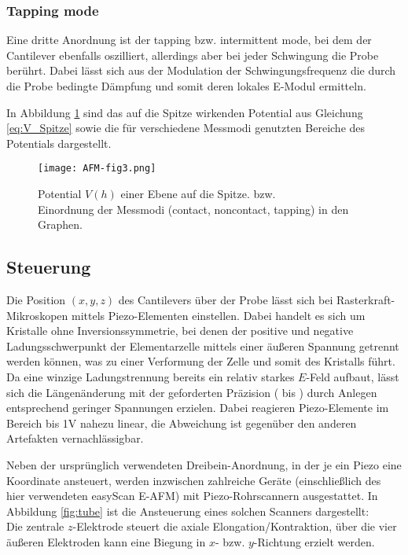 \subsubsection{Tapping mode}
 Eine dritte Anordnung ist der tapping bzw. intermittent mode, bei dem der Cantilever ebenfalls oszilliert, allerdings aber bei jeder Schwingung die Probe berührt. Dabei lässt sich aus der Modulation der Schwingungsfrequenz die durch die Probe bedingte Dämpfung und somit deren lokales E-Modul ermitteln.


In Abbildung \ref{fig:Potential} sind das auf die Spitze wirkenden Potential aus Gleichung \eqref{eq:V_Spitze} sowie die für verschiedene Messmodi genutzten Bereiche des Potentials dargestellt.


\begin{figure}[p]
	\centering
	\texttt{[image: AFM-fig3.png]}
	\caption[Potential $V(h)$ einer Ebene auf die Spitze]
		     {Potential $V(h)$ einer Ebene auf die Spitze. \cite{lit:grenoble} bzw. \cite{lit:jpk}\\
			Einordnung der Messmodi (contact, noncontact, tapping) in den Graphen.}
	\label{fig:Potential}
\end{figure}

\subsection{Steuerung}
Die Position $(x,y,z)$ des Cantilevers über der Probe lässt sich bei Rasterkraft-Mikroskopen mittels Piezo-Elementen einstellen. Dabei handelt es sich um Kristalle ohne Inversionssymmetrie, bei denen der positive und negative Ladungsschwerpunkt der Elementarzelle mittels einer äußeren Spannung getrennt werden können, was zu einer Verformung der Zelle und somit des Kristalls führt. Da eine winzige Ladungstrennung bereits ein relativ starkes $E$-Feld aufbaut, lässt sich die Längenänderung mit der geforderten Präzision (\pico\metre{} bis \micro\metre) durch Anlegen entsprechend geringer Spannungen erzielen. Dabei reagieren Piezo-Elemente im Bereich bis 1V nahezu linear, die Abweichung ist gegenüber den anderen Artefakten vernachlässigbar.

Neben der ursprünglich verwendeten Dreibein-Anordnung, in der je ein Piezo eine Koordinate ansteuert, werden inzwischen  zahlreiche Geräte (einschließlich des hier verwendeten easyScan E-AFM) mit Piezo-Rohrscannern ausgestattet. In Abbildung \ref{fig:tube} ist die Ansteuerung eines solchen Scanners dargestellt:\\
Die zentrale $z$-Elektrode steuert die axiale Elongation/Kontraktion, über die vier äußeren Elektroden kann eine Biegung in $x$- bzw. $y$-Richtung erzielt werden. 

